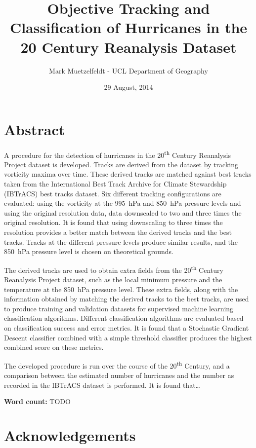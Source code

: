 \documentclass[pdftex,12pt,a4paper]{report}
\title{Objective Tracking and Classification of Hurricanes in the 20\ts{th} Century Reanalysis Dataset}
\author{Mark Muetzelfeldt - UCL Department of Geography}
\date{29 August, 2014}
\newcommand{\ts}{\textsuperscript}
\begin{document}


\onehalfspacing
\section*{Abstract}

A procedure for the detection of hurricanes in the 20\ts{th} Century Reanalysis Project dataset is
developed. Tracks are derived from the dataset by tracking vorticity maxima over time. These derived
tracks are matched against best tracks taken from the International Best Track Archive for Climate
Stewardship (IBTrACS) best tracks dataset. Six different tracking configurations are evaluated:
using the vorticity at the \SI{995}{hPa} and \SI{850}{hPa} pressure levels and using the original
resolution data, data downscaled to two and three times the original resolution. It is found that
using downscaling to three times the resolution provides a better match between the derived tracks
and the best tracks. Tracks at the different pressure levels produce similar results, and the
\SI{850}{hPa} pressure level is chosen on theoretical grounds.

The derived tracks are used to obtain extra fields from the 20\ts{th} Century Reanalysis
Project dataset, such as the local minimum pressure and the temperature at the \SI{850}{hPa}
pressure level. These extra fields, along with the information obtained by matching the derived
tracks to the best tracks, are used to produce training and validation datasets for supervised
machine learning classification algorithms. Different classification algorithms are evaluated based
on classification success and error metrics. It is found that a Stochastic Gradient Descent
classifier combined with a simple threshold classifier produces the highest combined score on these
metrics.

The developed procedure is run over the course of the 20\ts{th} Century, and a comparison between
the estimated number of hurricanes and the number as recorded in the IBTrACS dataset is performed.
It is found that\dots

\begin{center}
\textbf{Word count:} TODO
\end{center}

\section*{Acknowledgements}
\end{document}
